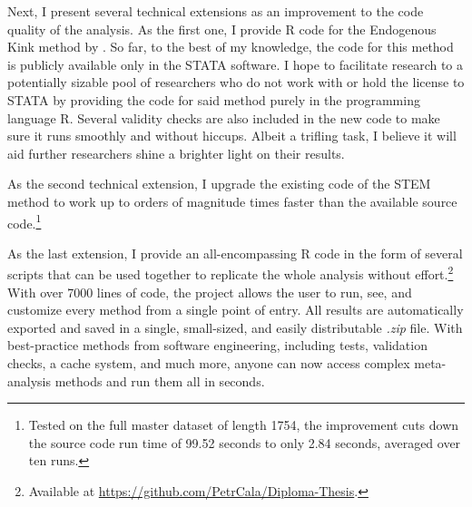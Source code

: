 Next, I present several technical extensions as an improvement to the code quality of the analysis. As the first one, I provide R code for the Endogenous Kink method by \citep{Bom2019Kink}. So far, to the best of my knowledge, the code for this method is publicly available only in the STATA software. I hope to facilitate research to a potentially sizable pool of researchers who do not work with or hold the license to STATA by providing the code for said method purely in the programming language R. Several validity checks are also included in the new code to make sure it runs smoothly and without hiccups. Albeit a trifling task, I believe it will aid further researchers shine a brighter light on their results.

As the second technical extension, I upgrade the existing code of the STEM method \citep{Furukawa2019Stem} to work up to orders of magnitude times faster than the available source code.\footnote{Tested on the full master dataset of length 1754, the improvement cuts down the source code run time of 99.52 seconds to only 2.84 seconds, averaged over ten runs.}

As the last extension, I provide an all-encompassing R code in the form of several scripts that can be used together to replicate the whole analysis without effort.\footnote{Available at \href{https://github.com/PetrCala/Diploma-Thesis}{https://github.com/PetrCala/Diploma-Thesis}.} With over 7000 lines of code, the project allows the user to run, see, and customize every method from a single point of entry. All results are automatically exported and saved in a single, small-sized, and easily distributable \textit{.zip} file. With best-practice methods from software engineering, including tests, validation checks, a cache system, and much more, anyone can now access complex meta-analysis methods and run them all in seconds.